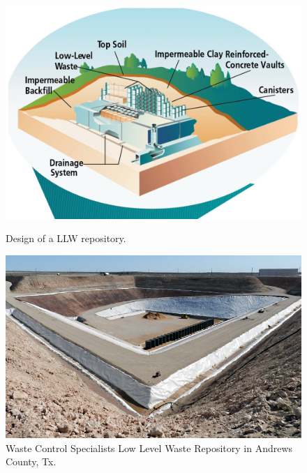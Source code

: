 

  \begin{figure}[htbp!]
    \begin{center}
    \begin{minipage}[t]{0.44\textwidth}
      \includegraphics[width=\textwidth]{./images/llw-disposal-cartoon}
      \caption{Design of a LLW repository.}
        \label{fig:llw-cartoon}
    \end{minipage}
    \hspace{0.01\textwidth}
    \begin{minipage}[t]{0.44\textwidth}
      \includegraphics[width=\textwidth]{./images/wcs-andrews-tx.png}
      \caption{Waste Control Specialists Low Level Waste Repository in Andrews 
            County, Tx.}
        \label{fig:wcs}
    \end{minipage}
    \end{center}
  \end{figure}


